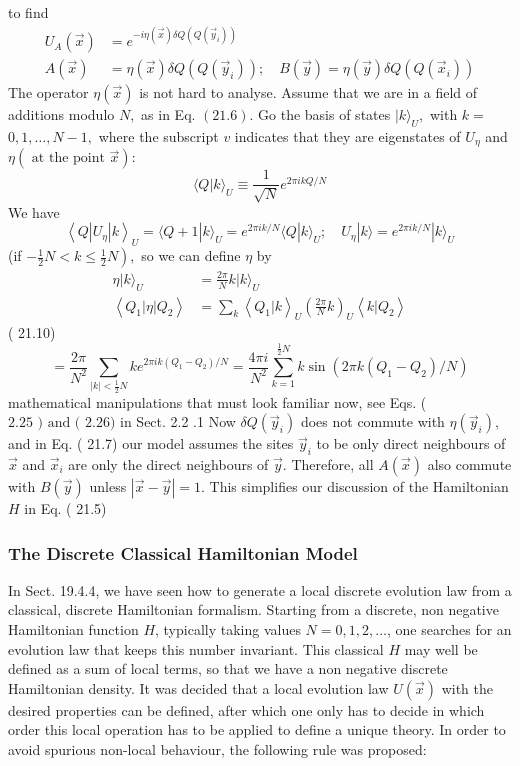 \documentclass[main.tex]{subfiles}
\begin{document}
to find
$$
\begin{aligned}
U_{A}(\vec{x}) &=e^{-i \eta(\vec{x}) \delta Q\left(Q\left(\vec{y}_{i}\right)\right)} \\
A(\vec{x}) &=\eta(\vec{x}) \delta Q\left(Q\left(\vec{y}_{i}\right)\right) ; \quad B(\vec{y})=\eta(\vec{y}) \delta Q\left(Q\left(\vec{x}_{i}\right)\right)
\end{aligned}
$$
The operator $\eta(\vec{x})$ is not hard to analyse. Assume that we are in a field of additions modulo $N,$ as in Eq. $(21.6) .$ Go the basis of states $|k\rangle_U,$ with $k=$
$0,1, \ldots, N-1,$ where the subscript $v$ indicates that they are eigenstates of $U_{\eta}$ and
$\eta(\text { at the point } \vec{x}):$
$$
\langle Q | k\rangle_U \equiv \frac{1}{\sqrt{N}} e^{2 \pi i k Q / N}
$$
We have
$$
\left\langle Q\left|U_{\eta}\right| k\right\rangle_U=\langle Q+1 | k\rangle_U=e^{2 \pi i k / N}\langle Q | k\rangle_U ; \quad U_{\eta}|k\rangle= e^{2 \pi i k / N}|k\rangle_U
$$
(if $\left.-\frac{1}{2} N<k \leq \frac{1}{2} N\right),$ so we can define $\eta$ by
$$
\begin{aligned}
\eta|k\rangle_U &=\frac{2 \pi}{N} k|k\rangle_U \\
\left\langle Q_{1}|\eta| Q_{2}\right\rangle &=\sum_{k}\left\langle Q_{1} | k\right\rangle_U\left(\frac{2 \pi}{N} k\right)_U\left\langle k | Q_{2}\right\rangle
\end{aligned}
$$
( 21.10)
$$
=\frac{2 \pi}{N^{2}} \sum_{|k|<\frac{1}{2} N} k e^{2 \pi i k\left(Q_{1}-Q_{2}\right) / N}=\frac{4 \pi i}{N^{2}} \sum_{k=1}^{\frac{1}{2} N} k \sin \left(2 \pi k\left(Q_{1}-Q_{2}\right) / N\right)
$$
mathematical manipulations that must look familiar now, see Eqs. ( $2.25 \text { ) and ( } 2.26)$
in Sect. 2.2 .1 Now $\delta Q\left(\vec{y}_{i}\right)$ does not commute with $\eta\left(\vec{y}_{i}\right),$ and in Eq. ( 21.7) our model assumes the sites $\vec{y}_{i}$ to be only direct neighbours of $\vec{x}$ and $\vec{x}_{i}$ are only the direct neighbours
of $\vec{y} .$ Therefore, all $A(\vec{x})$ also commute with $B(\vec{y})$ unless $|\vec{x}-\vec{y}|=1 .$ This simplifies
our discussion of the Hamiltonian $H$ in Eq. ( 21.5)




\subsubsection{The Discrete Classical Hamiltonian Model}\label{ch21.1.2}

In Sect. 19.4.4, we have seen how to generate a local discrete evolution law from a classical, discrete Hamiltonian formalism. Starting from a discrete, non negative Hamiltonian function $H$, typically taking values $N = 0, 1, 2,\ldots$, one searches for an evolution law that keeps this number invariant. This classical $H$ may well be defined as a sum of local terms, so that we have a non negative discrete Hamiltonian density. It was decided that a local evolution law $U(\vec x)$ with the desired properties can be defined, after which one only has to decide in which order this local operation has to be applied to define a unique theory. In order to avoid spurious non-local behaviour, the following rule was proposed:
\end{document}
